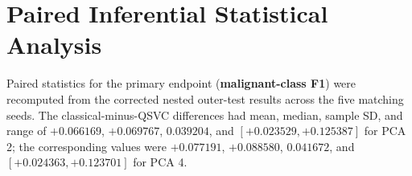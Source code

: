 \documentclass[12pt,a4paper]{article}
\begin{document}
\section{Paired Inferential Statistical Analysis}
Paired statistics for the primary endpoint (\textbf{malignant-class F1}) were recomputed from the corrected nested outer-test results across the five matching seeds. The classical-minus-QSVC differences had mean, median, sample SD, and range of $+0.066169$, $+0.069767$, $0.039204$, and $[+0.023529,+0.125387]$ for PCA 2; the corresponding values were $+0.077191$, $+0.088580$, $0.041672$, and $[+0.024363,+0.123701]$ for PCA 4.

\begin{table}[htbp]
\centering
\caption{Paired Statistical Hypothesis Testing on Primary Endpoint (Malignant F1 Score, $n=5$ Splits).}
\label{tab:paired_stat}
\vspace{2mm}
\end{table}
\end{document}
